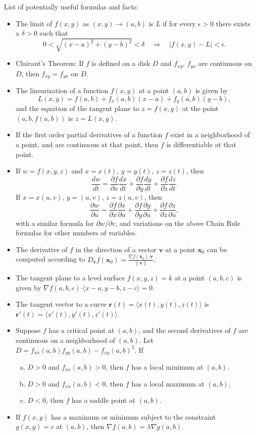 \documentclass[12pt]{article}
\newcommand{\di}{\displaystyle}
\newcommand{\dotp}{\boldsymbol{\cdot}}
\newcommand{\pd}[2]{\frac{\partial #1}{\partial #2}}
\newcommand{\rd}[2]{\frac{d #1}{d #2}}
\begin{document}
\begin{center}
List of potentially useful formulas and facts:
\end{center}


\begin{itemize}
\item The limit of $f(x,y)$ as $(x,y)\to (a,b)$ is $L$ if for every $\epsilon>0$ there exists a $\delta>0$ such that
\[
0<\sqrt{(x-a)^2+(y-b)^2}<\delta \quad\Rightarrow\quad \lvert f(x,y)-L\rvert<\epsilon.
\]
\item Clairaut's Theorem: If $f$ is defined on a disk $D$ and $f_{xy},\, f_{yx}$ are continuous on $D$, then $f_{xy}=f_{yx}$ on $D$.
\item The linearization of a function $f(x,y)$ at a point $(a,b)$ is given by
\[
L(x,y) = f(a,b)+f_x(a,b)(x-a)+f_y(a,b)(y-b),
\]
and the equation of the tangent plane to $z=f(x,y)$ at the point $(a,b,f(a,b))$ is $z=L(x,y)$.
\item If the first order partial derivatives of a function $f$ exist in a neighborhood of a point, and are continuous at that point, then $f$ is differentiable at that point.
\item If $w=f(x,y,z)$ and $x=x(t),\, y=y(t),\, z=z(t)$, then
\[
\frac{dw}{dt} = \pd{f}{x}\rd{x}{t}+\pd{f}{y}\rd{y}{t}+\pd{f}{z}\rd{z}{t}.
\]
If $x=x(u,v), \, y=(u,v),\, z=z(u,v)$, then
\[
\pd{w}{u} = \pd{f}{x}\pd{x}{u}+\pd{f}{y}\pd{y}{u}+\pd{f}{z}\pd{z}{u},
\]
with a similar formula for $\partial w/\partial v$, and variations on the above Chain Rule formulas for other numbers of variables.
\item The derivative of $f$ in the direction of a vector $\mathbf{v}$ at a point $\mathbf{x}_0$ can be computed according to $\di D_{\mathbf{v}}f(\mathbf{x}_0) = \frac{\nabla f(\mathbf{x}_0)\dotp \mathbf{v}}{\lVert\mathbf{v}\rVert}$.
\item The tangent plane to a level surface $f(x,y,z)=k$ at a point $(a,b,c)$ is given by $\nabla f(a,b,c)\dotp\langle x-a, y-b, z-c\rangle = 0$.
\item The tangent vector to a curve $\mathbf{r}(t) = \langle x(t),y(t),z(t)\rangle$ is $\mathbf{r}'(t) = \langle x'(t), y'(t), z'(t)\rangle$.
\item Suppose $f$ has a critical point at $(a,b)$, and the second derivatives of $f$ are continuous on a neighborhood of $(a,b)$. Let $D = f_{xx}(a,b)f_{yy}(a,b)-f_{xy}(a,b)^2$. If
\begin{enumerate}[(a)]
\item $D>0$ and $f_{xx}(a,b)>0$, then $f$ has a local minimum at $(a,b)$.
\item $D>0$ and $f_{xx}(a,b)<0$, then $f$ has a local maximum at $(a,b)$.
\item $D<0$, then $f$ has a saddle point at $(a,b)$.
\end{enumerate}
\item If $f(x,y)$ has a maximum or minimum subject to the constraint $g(x,y)=c$ at $(a,b)$, then $\nabla f(a,b) = \lambda \nabla g(a,b)$.
\end{itemize}
\end{document}

